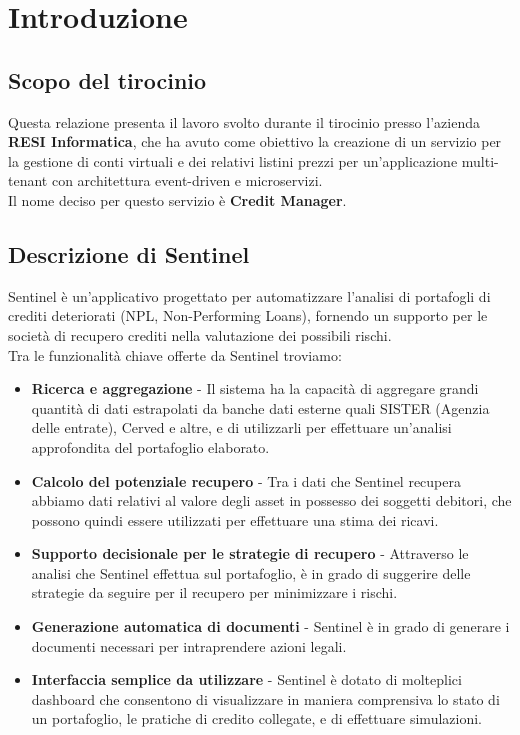 \chapter{Introduzione}

\section{Scopo del tirocinio}
Questa relazione presenta il lavoro svolto durante il tirocinio presso l'azienda \textbf{RESI Informatica}, che ha avuto come obiettivo la creazione di un servizio per la
gestione di conti virtuali e dei relativi listini prezzi per un'applicazione multi-tenant con architettura event-driven e microservizi.
\\
Il nome deciso per questo servizio \`e \textbf{Credit Manager}.

\section{Descrizione di Sentinel}
Sentinel \`e un'applicativo progettato per automatizzare l'analisi di portafogli di crediti deteriorati (NPL, Non-Performing Loans), fornendo un supporto per le societ\`a
di recupero crediti nella valutazione dei possibili rischi.
\\
Tra le funzionalit\`a chiave offerte da Sentinel troviamo:
\begin{itemize}
  \item \textbf{Ricerca e aggregazione} - Il sistema ha la capacit\`a di aggregare grandi quantit\`a di dati estrapolati da banche dati esterne quali SISTER (Agenzia delle entrate), Cerved e altre, e di utilizzarli
    per effettuare un'analisi approfondita del portafoglio elaborato.
  \item \textbf{Calcolo del potenziale recupero} - Tra i dati che Sentinel recupera abbiamo dati relativi al valore degli asset in possesso dei soggetti debitori, che possono
    quindi essere utilizzati per effettuare una stima dei ricavi.
  \item \textbf{Supporto decisionale per le strategie di recupero} - Attraverso le analisi che Sentinel effettua sul portafoglio, \`e in grado di suggerire delle strategie
    da seguire per il recupero per minimizzare i rischi.
  \item \textbf{Generazione automatica di documenti} - Sentinel \`e in grado di generare i documenti necessari per intraprendere azioni legali.
  \item \textbf{Interfaccia semplice da utilizzare} - Sentinel \`e dotato di molteplici dashboard che consentono di visualizzare in maniera comprensiva lo stato di un portafoglio,
    le pratiche di credito collegate, e di effettuare simulazioni.
\end{itemize}

